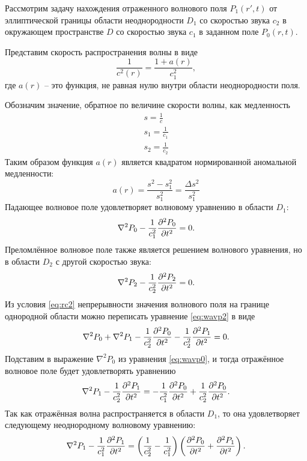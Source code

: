 \documentclass[a4paper, fontsize=14pt]{article}
\begin{document}
	Рассмотрим задачу нахождения отраженного волнового поля $P_1(r',t)$ от эллиптической границы области неоднородности $D_1$ со скоростью звука  $c_2$ в окружающем пространстве $D$ со скоростью звука $c_1$ в заданном поле $P_0(r,t)$. 
	
	
	Представим скорость распространения волны в виде
	\begin{equation}
		\frac{1}{c^2(r)} = \frac{1+a(r)}{c_1^2},
	\end{equation}
	где $a(r)$ -- это функция, не равная нулю внутри области неоднородности поля.
	  
	Обозначим значение, обратное по величине скорости волны, как медленность 
	\begin{gather*}
		s = \frac{1}{c} \\
		s_1 = \frac{1}{c_1} \\
		s_2 = \frac{1}{c_2}
	\end{gather*}
	Таким образом функция $a(r)$ является квадратом нормированной аномальной медленности:
	$$
	a(r) = \frac{s^2 - s_1^2}{s_1^2} = \frac{\Delta s^2}{s_1^2}
	$$
	Падающее волновое поле удовлетворяет волновому уравнению в области $D_1$:
	\begin{equation}
		\nabla^2 P_0 - \frac{1}{c_1^2}\diff[2]{P_0}{t} = 0.
		\label{eq:wavp0}
	\end{equation}
	Преломлённое волновое поле также является решением волнового уравнения, но в области $D_2$ с другой скоростью звука:
	\begin{equation}
		\nabla^2 P_2 - \frac{1}{c_2^2}\diff[2]{P_2}{t} = 0.
		\label{eq:wavp2}
	\end{equation}
	Из условия \eqref{eq:rc2} непрерывности значения  волнового поля на границе однородной области можно переписать уравнение \eqref{eq:wavp2} в виде
	\begin{equation}
		\nabla^2 P_0 + \nabla^2 P_1 - \frac{1}{c_2^2}\diff[2]{P_0}{t} - \frac{1}{c_2^2}\diff[2]{P_1}{t}  = 0.
		\label{eq:wavp01sum}
	\end{equation}
	Подставим в выражение $\nabla^2 P_0$ из уравнения \eqref{eq:wavp0}, и
	тогда отражённое волновое поле будет удовлетворять уравнению \cite{bleistein2012mathematical}
	\begin{equation}
		\nabla^2 P_1 - \frac{1}{c_2^2}\diff[2]{P_1}{t}  = - \frac{1}{c_1^2}\diff[2]{P_0}{t} + \frac{1}{c_2^2}\diff[2]{P_0}{t}.
	\end{equation}
	Так как отражённая волна распространяется в области $D_1$, то она удовлетворяет следующему неоднородному волновому уравнению:
	\begin{equation}
		\nabla^2 P_1 - \frac{1}{c_1^2}\diff[2]{P_1}{t}  = \left(\frac{1}{c_2^2} - \frac{1}{c_1^2}\right)\left(\diff[2]{P_0}{t} + \diff[2]{P_1}{t}\right).
		\label{eq:wavp1inh}
	\end{equation}
\end{document}
